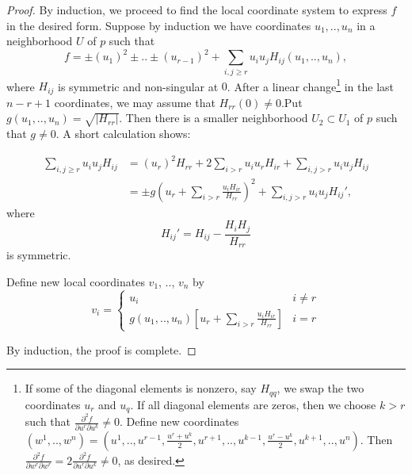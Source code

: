 \documentclass[a4paper,11pt,reqno]{amsart}
\begin{document}
\begin{proof}
  By induction, we proceed to find the local coordinate system to express $f$ in
  the desired form. Suppose by induction we have coordinates $u_1, .., u_n$ in a
  neighborhood $U$ of $p$ such that
  \begin{equation}
    f = \pm (u_1)^2 \pm .. \pm (u_{r-1})^2 + \sum_{i, j \ge r} u_iu_jH_{ij}(u_1,
    .., u_n),
  \end{equation}
  where $H_{ij}$ is symmetric and non-singular at $0$. After a linear
  change\footnote{If some of the diagonal elements is nonzero, say $H_{qq}$, we
    swap the two coordinates $u_r$ and $u_q$. If all diagonal elements are
    zeros, then we choose $k > r$ such that $\frac{\partial^2 f}{\partial
      u^r \partial u^{k}} \ne 0$. Define new coordinates $(w^1, .., w^n) = (u^1,
    .., u^{r-1}, \frac{u^r+u^k}{2}, u^{r+1}, .., u^{k-1}, \frac{u^r-u^k}{2},
    u^{k+1}, .., u^n)$. Then $\frac{\partial^2 f}{\partial w^r \partial w^r} =
    2\frac{\partial^2 f}{\partial u^r \partial u^k} \ne 0$, as desired.} in the
  last $n-r+1$ coordinates, we may assume that $H_{rr}(0) \ne 0$.Put $g(u_1, ..,
  u_n) = \sqrt{|{H_{rr}}|}$. Then there is a smaller neighborhood $U_2 \subset
  U_1$ of $p$ such that $g \ne 0$. A short calculation shows:

  \begin{equation}
    \begin{aligned}
      \sum_{i,j\ge r}u_iu_jH_{ij} 
      &= (u_r)^2H_{rr} + 2\sum_{i>r}u_iu_rH_{ir}+\sum_{i,j>r}u_iu_jH_{ij} \\
      &= \pm g(u_r+\sum_{i>r}\frac{u_iH_{ir}}{H_{rr}})^2+\sum_{i,j>r}u_iu_jH_{ij}',
    \end{aligned}
  \end{equation}
  where
  \begin{equation}
    H_{ij}' = H_{ij}-\frac{H_iH_j}{H_{rr}}
  \end{equation}
  is symmetric.

  Define new local coordinates
  $v_1$, .., $v_n$ by
  \begin{equation}
    v_i = 
    \begin{cases}
      u_i & i \ne r \\
      g(u_1, .., u_n)\left[u_r+\sum_{i>r}\frac{u_iH_{ir}}{H_{rr}}\right] & i = r
    \end{cases}
  \end{equation}

  By induction, the proof is complete.

\end{proof}
\end{document}
